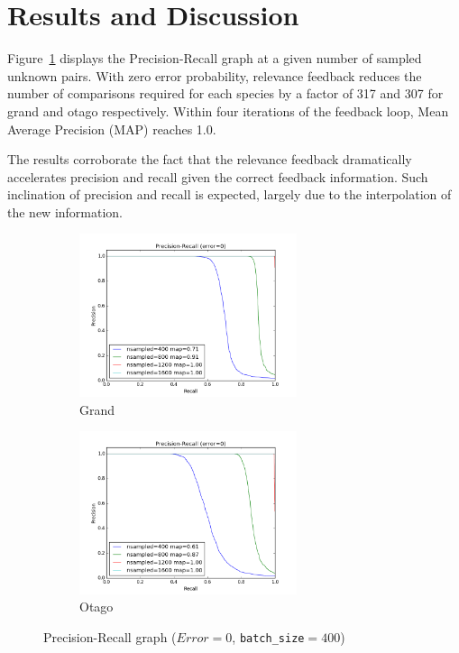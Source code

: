 

\section{Results and Discussion} %
\label{sec:results}

Figure~\ref{fig:pr_curves} displays the Precision-Recall graph at a given number
of sampled unknown pairs. With zero error probability, relevance feedback
reduces the number of comparisons required for each species by a factor of 317
and 307 for grand and otago respectively. Within four iterations of the feedback
loop, Mean Average Precision (MAP) reaches 1.0.

The results corroborate the fact that the relevance feedback dramatically
accelerates precision and recall given the correct feedback information. Such
inclination of precision and recall is expected, largely due to the
interpolation of the new information.

\begin{figure}[htbp]
  \centering
  \begin{subfigure}[t]{\textwidth}
      \centering
      \includegraphics[width=0.7\textwidth]{pr/grand}
      \caption{Grand}
  \end{subfigure}%

  \begin{subfigure}[t]{\textwidth}
      \centering
      \includegraphics[width=0.7\textwidth]{pr/otago}
      \caption{Otago}
  \end{subfigure}%
  \captionsetup{justification=centering}
  \caption{Precision-Recall graph ($Error=0$, \texttt{batch\_size}$=400$)}
  \label{fig:pr_curves} %
\end{figure}

